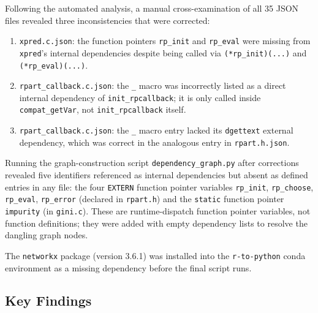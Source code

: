 \documentclass[12pt]{article}
\begin{document}
Following the automated analysis, a manual cross-examination of all 35 JSON files revealed three inconsistencies that were corrected:
\begin{enumerate}
\item \texttt{xpred.c.json}: the function pointers \texttt{rp\_init} and \texttt{rp\_eval} were missing from \texttt{xpred}'s internal dependencies despite being called via \texttt{(*rp\_init)(...)} and \texttt{(*rp\_eval)(...)}.
\item \texttt{rpart\_callback.c.json}: the \texttt{\_} macro was incorrectly listed as a direct internal dependency of \texttt{init\_rpcallback}; it is only called inside \texttt{compat\_getVar}, not \texttt{init\_rpcallback} itself.
\item \texttt{rpart\_callback.c.json}: the \texttt{\_} macro entry lacked its \texttt{dgettext} external dependency, which was correct in the analogous entry in \texttt{rpart.h.json}.
\end{enumerate}

Running the graph-construction script \texttt{dependency\_graph.py} after corrections revealed five identifiers referenced as internal dependencies but absent as defined entries in any file: the four \texttt{EXTERN} function pointer variables \texttt{rp\_init}, \texttt{rp\_choose}, \texttt{rp\_eval}, \texttt{rp\_error} (declared in \texttt{rpart.h}) and the \texttt{static} function pointer \texttt{impurity} (in \texttt{gini.c}). These are runtime-dispatch function pointer variables, not function definitions; they were added with empty dependency lists to resolve the dangling graph nodes.

The \texttt{networkx} package (version 3.6.1) was installed into the \texttt{r-to-python} conda environment as a missing dependency before the final script runs.

\subsection{Key Findings}
\end{document}
